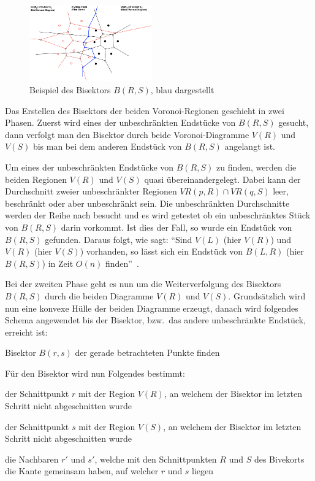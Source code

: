 \newpage{}

\begin{figure}[h]
\centering
\includegraphics[width=200px]{images/voronoi_divide_conquer_01.png}
\caption{Beispiel des Bisektors $B(R,S)$\protect\footnotemark, blau dargestellt}
\label{fig:voronoiRegionExample01}
\end{figure}

Das Erstellen des Bisektors der beiden Voronoi-Regionen geschieht in zwei Phasen. Zuerst wird eines der unbeschränkten Endstücke von $B(R,S)$ gesucht, dann verfolgt man den Bisektor durch beide Voronoi-Diagramme $V(R)$ und $V(S)$ bis man bei dem anderen Endstück von $B(R,S)$ angelangt ist.

Um eines der unbeschränkten Endstücke von $B(R,S)$ zu finden, werden die beiden Regionen $V(R)$ und $V(S)$ quasi übereinandergelegt. Dabei kann der Durchschnitt zweier unbeschränkter Regionen $VR(p, R) \cap VR(q, S)$ leer, beschränkt oder aber unbeschränkt sein. Die unbeschränkten Durchschnitte werden der Reihe nach besucht und es wird getestet ob ein unbeschränktes Stück von $B(R,S)$ darin vorkommt. Ist dies der Fall, so wurde ein Endstück von $B(R,S)$ gefunden. Daraus folgt, wie \citeauthor{klein2005algorithmischegeometrie} sagt: ``Sind $V(L)$ (hier $V(R)$) und $V(R)$ (hier $V(S)$) vorhanden, so lässt sich ein Endstück von $B(L,R)$ (hier $B(R,S)$) in Zeit $O(n)$ finden''~\parencite[S. 298 bis 299]{klein2005algorithmischegeometrie}.

Bei der zweiten Phase geht es nun um die Weiterverfolgung des Bisektors $B(R,S)$ durch die beiden Diagramme $V(R)$ und $V(S)$. Grundsätzlich wird nun eine konvexe Hülle der beiden Diagramme erzeugt, danach wird folgendes Schema angewendet bis der Bisektor, bzw.\ das andere unbeschränkte Endstück, erreicht ist:

\begin{compactitem}
  \item Bisektor $B(r,s)$ der gerade betrachteten Punkte finden
  \item Für den Bisektor wird nun Folgendes bestimmt:
  \begin{compactitem}
    \item der Schnittpunkt $r$ mit der Region $V(R)$, an welchem der Bisektor im letzten Schritt nicht abgeschnitten wurde
    \item der Schnittpunkt $s$ mit der Region $V(S)$, an welchem der Bisektor im letzten Schritt nicht abgeschnitten wurde
    \item die Nachbaren $r'$ und $s'$, welche mit den Schnittpunkten $R$ und $S$ des Bivekorts die Kante gemeinsam haben, auf welcher $r$ und $s$ liegen
  \end{compactitem}
\end{compactitem}

